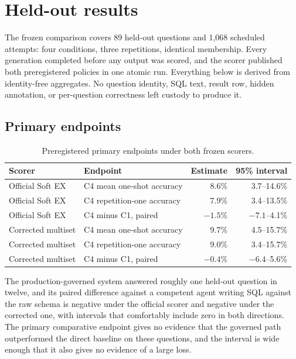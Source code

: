 \section{Held-out results}
\label{sec:results}

The frozen comparison covers 89 held-out questions and 1,068 scheduled attempts:
four conditions, three repetitions, identical membership. Every generation
completed before any output was scored, and the scorer published both
preregistered policies in one atomic run. Everything below is derived from
identity-free aggregates. No question identity, SQL text, result row, hidden
annotation, or per-question correctness left custody to produce it.

\subsection{Primary endpoints}

\begin{table}[htbp]
\centering
\caption{Preregistered primary endpoints under both frozen scorers.}
\label{tab:primary}
\begin{tabular}{llrr}
\toprule
Scorer & Endpoint & Estimate & 95\% interval \\
\midrule
Official Soft EX & C4 mean one-shot accuracy & 8.6\% & 3.7--14.6\% \\
Official Soft EX & C4 repetition-one accuracy & 7.9\% & 3.4--13.5\% \\
Official Soft EX & C4 minus C1, paired & $-1.5$\% & $-7.1$--4.1\% \\
Corrected multiset & C4 mean one-shot accuracy & 9.7\% & 4.5--15.7\% \\
Corrected multiset & C4 repetition-one accuracy & 9.0\% & 3.4--15.7\% \\
Corrected multiset & C4 minus C1, paired & $-0.4$\% & $-6.4$--5.6\% \\
\bottomrule
\end{tabular}
\end{table}

The production-governed system answered roughly one held-out question in twelve,
and its paired difference against a competent agent writing SQL against the raw
schema is negative under the official scorer and negative under the corrected
one, with intervals that comfortably include zero in both directions. The primary
comparative endpoint gives no evidence that the governed path outperformed the
direct baseline on these questions, and the interval is wide enough that it also
gives no evidence of a large loss.

